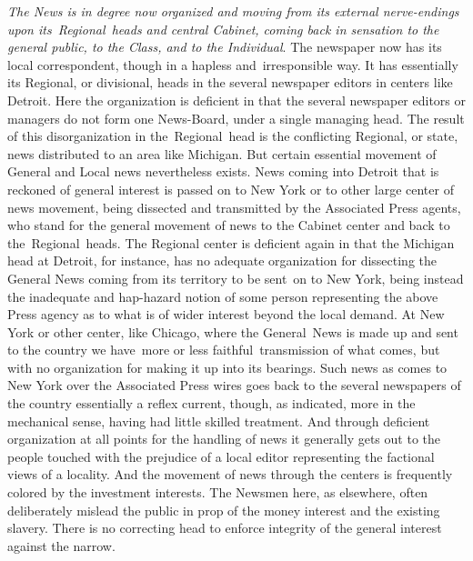 \documentclass[openany,nobib]{tufte-book}
\begin{document}
\vspace{0.05in}

\emph{The News is in degree now organized and moving from its external
nerve-endings upon its~Regional~heads and central Cabinet, coming back
in sensation to the general public, to the Class, and to the
Individual}. The newspaper now has its local correspondent, though in a
hapless and~irresponsible way. It has essentially its Regional, or
divisional, heads in the several newspaper editors in centers like
Detroit. Here the organization is deficient in that the several
newspaper editors or managers do not form one News-Board, under a single
managing head. The result of this disorganization in the~Regional~head
is the conflicting Regional, or state, news distributed to an area like
Michigan. But certain essential movement of General and Local news
nevertheless exists. News coming into Detroit that is reckoned of
general interest is passed on to New York or to other large center of
news movement, being dissected and transmitted by the Associated Press
agents, who stand for the general movement of news to the Cabinet center
and back to the~Regional~heads. The Regional center is deficient again
in that the Michigan head at Detroit, for instance, has no adequate
organization for dissecting the General News coming from its territory
to be sent~on to New York, being instead the inadequate and hap-hazard
notion of some person representing the above Press agency as to what is
of wider interest beyond the local demand. At New York or other center,
like Chicago, where the General~News is made up and sent to the country
we have~more or less faithful~transmission of what comes, but with no
organization for making it up into its bearings. Such news as comes to
New York over the Associated Press wires goes back to the several
newspapers of the country essentially a reflex current, though, as
indicated, more in the mechanical sense, having had little skilled
treatment. And through deficient organization at all points for the
handling of news it generally gets out to the people touched with the
prejudice of a local editor representing the factional views of a
locality. And the movement of news through the centers is frequently
colored by the investment interests. The Newsmen here, as elsewhere,
often deliberately mislead the public in prop of the money interest and
the existing slavery. There is no correcting head to enforce integrity
of the general interest against the narrow.~~
\end{document}
